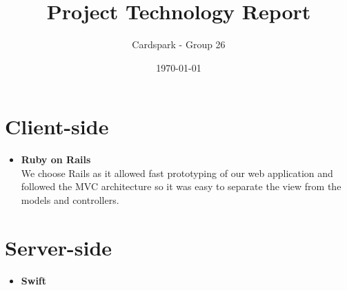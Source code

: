 \documentclass[a4wide, 11pt]{article}
\begin{document}
\title{Project Technology Report}

\author{Cardspark - Group 26}

\date{\today}         %

\maketitle            %

\section{Client-side}
\begin{itemize}
\item \textbf{Ruby on Rails}\\
We choose Rails as it allowed fast prototyping of our web application and followed the MVC architecture so it was easy to separate the view from the models and controllers.
\end{itemize}

\section{Server-side}
\begin{itemize}
\item \textbf{Swift}\\ 
\end{itemize}
\end{document}
